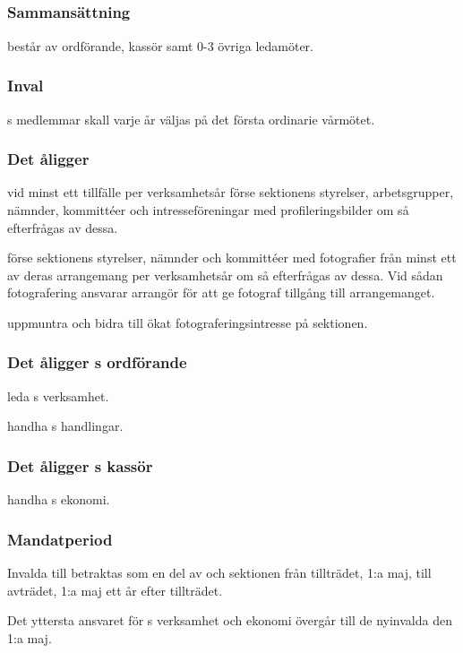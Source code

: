 \subsection{\FLASHITFULL}
\subsubsection{Sammansättning}
\FLASHIT{} består av ordförande, kassör samt 0-3 övriga ledamöter.

\subsubsection{Inval}
\FLASHIT{}s medlemmar skall varje år väljas på det första ordinarie vårmötet.

\subsubsection{Det åligger \FLASHIT}
\begin{att}
	\item vid minst ett tillfälle per verksamhetsår förse sektionens styrelser, arbetsgrupper, nämnder, kommittéer och intresseföreningar med profileringsbilder om så efterfrågas av dessa.
	\item förse sektionens styrelser, nämnder och kommittéer med fotografier från minst ett av deras arrangemang per verksamhetsår om så efterfrågas av dessa. Vid sådan fotografering ansvarar arrangör för att ge fotograf tillgång till arrangemanget.
	\item uppmuntra och bidra till ökat fotograferingsintresse på sektionen.
\end{att}

\subsubsection{Det åligger \FLASHIT{}s ordförande}
\begin{att}
	\item leda \FLASHIT{}s verksamhet.
	\item handha \FLASHIT{}s handlingar.
\end{att}

\subsubsection{Det åligger \FLASHIT{}s kassör}
\begin{att}
	\item handha \FLASHIT{}s ekonomi.
\end{att}

\subsubsection{Mandatperiod}
Invalda till \FLASHIT{} betraktas som en del av \FLASHIT{} och sektionen från tillträdet, 1:a maj, till avträdet, 1:a maj ett år efter tillträdet.

Det yttersta ansvaret för \FLASHIT{}s verksamhet och ekonomi övergår till de nyinvalda den 1:a maj.